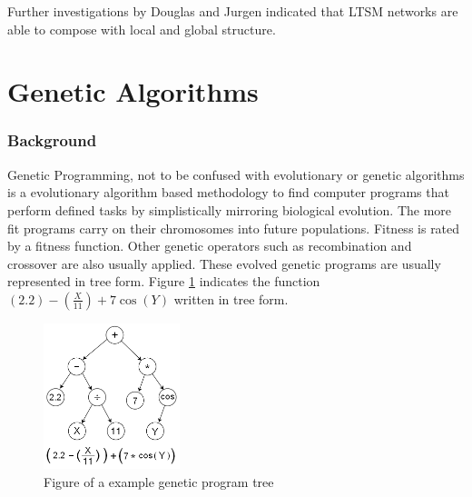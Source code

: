 Further investigations by Douglas and Jurgen indicated that \ac{LTSM} networks are able to compose with local and global structure.

\section{Genetic Algorithms}
\subsubsection{Background}

Genetic Programming, not to be confused with evolutionary or genetic algorithms is a evolutionary algorithm based methodology to find computer programs that perform defined tasks by simplistically mirroring biological evolution.
The more fit programs carry on their chromosomes into future populations. Fitness is rated by a fitness function. Other genetic operators such as recombination and crossover are also usually applied. 
These evolved genetic programs are usually represented in tree form. Figure \ref{ims:gpt} indicates the function $ (2.2) - (\frac{X}{11}) + 7\cos(Y)$ written in tree form.
\begin{figure}[!bh]
\centerline{\includegraphics[width=150px]{../images/gpt.png}}
\caption{Figure of a example genetic program tree}
\label{ims:gpt}
\end{figure}

